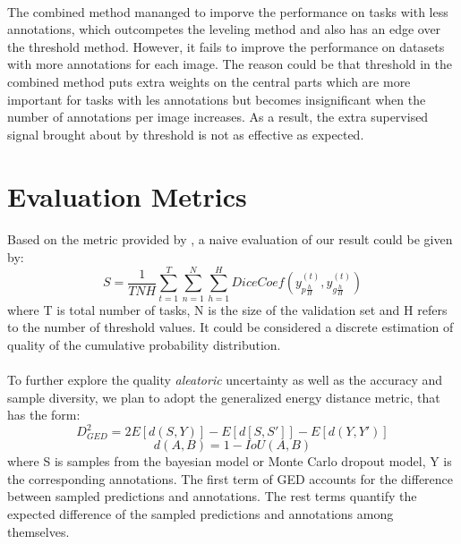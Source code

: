\documentclass[12pt]{extarticle}
\begin{document}
\paragraph{}
The combined method mananged to imporve the performance on tasks with less annotations, which outcompetes the leveling method and also has 
an edge over the threshold method. However, it fails to improve the performance on datasets with 
more annotations for each image. The reason could be that threshold in the combined method puts extra 
weights on the central parts which are more important for tasks with les annotations but becomes insignificant when
the number of annotations per image increases. As a result, the extra supervised signal brought about by threshold 
is not as effective as expected.
\section{Evaluation Metrics}
\paragraph{}
Based on the metric provided by \cite{qubiq}, a naive evaluation of our result could be given by:
\begin{equation}
    S = \frac{1}{TNH}\sum_{t=1}^{T}\sum_{n=1}^{N}\sum_{h=1}^{H}DiceCoef(y_{p\frac{h}{H}}^{(t)}, y_{g\frac{h}{H}}^{(t)})
\end{equation}
where T is total number of tasks, N is the size of the validation set and H refers to 
the number of threshold values. It could be considered a discrete estimation of quality of the cumulative probability 
distribution.
\paragraph{}
To further explore the quality \textit{aleatoric} uncertainty as well as the accuracy and sample diversity, we plan to 
adopt the generalized energy distance metric, that has the form:
\begin{equation}
    D^2_{GED} = 2E[d(S, Y)] - E[d[S, S']] - E[d(Y, Y')]
\end{equation}
\begin{equation}
    d(A, B) = 1 - IoU(A, B)
\end{equation}
where S is samples from the bayesian model or Monte Carlo dropout model, Y is the corresponding 
annotations. The first term of GED accounts for the difference between sampled predictions
and annotations. The rest terms quantify the expected difference of the sampled predictions and 
annotations among themselves. 
\end{document}
